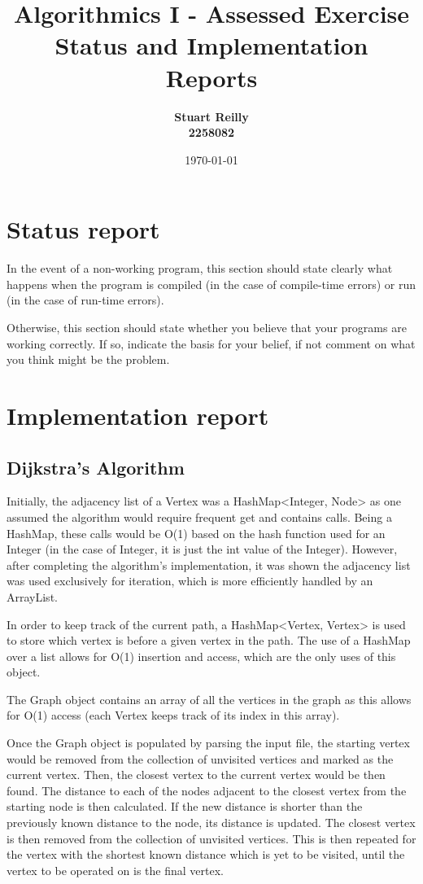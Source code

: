 \documentclass{article}
\title{Algorithmics I - Assessed Exercise\\ \vspace{4mm} 
Status and Implementation Reports}
\author{\bf Stuart Reilly\\ \bf 2258082}
\date{\today}
\begin{document}
\maketitle

\section*{Status report}

In the event of a non-working program, this section should state clearly what happens when the program is compiled (in the case of compile-time errors) or run (in the case of run-time errors).  

Otherwise, this section should state whether you believe that your programs are working correctly. If so, indicate the basis for your belief, if not comment on what you think might be the problem.

\section*{Implementation report}

\subsection*{Dijkstra's Algorithm}

Initially, the adjacency list of a Vertex was a HashMap<Integer, Node> as one assumed the algorithm would require
frequent get and contains calls.
Being a HashMap, these calls would be O(1) based on the hash function used for an Integer (in the case of Integer, it is
just the int value of the Integer).
However, after completing the algorithm's implementation, it was shown the adjacency list was used exclusively for
iteration, which is more efficiently handled by an ArrayList.

In order to keep track of the current path, a HashMap<Vertex, Vertex> is used to store which vertex is before a given
vertex in the path.
The use of a HashMap over a list allows for O(1) insertion and access, which are the only uses of this object.

The Graph object contains an array of all the vertices in the graph as this allows for O(1) access (each Vertex keeps
track of its index in this array).

Once the Graph object is populated by parsing the input file, the starting vertex would be removed from the collection
of unvisited vertices and marked as the current vertex.
Then, the closest vertex to the current vertex would be then found.
The distance to each of the nodes adjacent to the closest vertex from the starting node is then calculated.
If the new distance is shorter than the previously known distance to the node, its distance is updated.
The closest vertex is then removed from the collection of unvisited vertices.
This is then repeated for the vertex with the shortest known distance which is yet to be visited, until the vertex to be
operated on is the final vertex.
\end{document}
